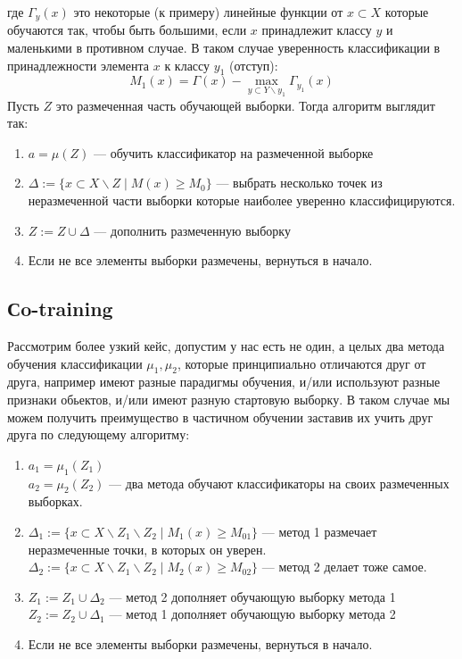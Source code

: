 где $\Gamma_y(x)$ это некоторые (к примеру) линейные функции от $x \subset X$ которые обучаются так, чтобы быть большими, если $x$ принадлежит классу $y$ и маленькими в противном случае. В таком случае уверенность классификации в принадлежности элемента $x$ к классу $y_1$ (отступ):
\begin{equation*}
    M_1(x) = \Gamma(x) - \max_{y \subset Y\backslash y_1}\Gamma_{y_1}(x) 
\end{equation*}
Пусть $Z$ это размеченная часть обучающей выборки. Тогда алгоритм выглядит так:
\begin{enumerate}
  \item $a = \mu(Z)$ --- обучить классификатор на размеченной выборке
  \item $\Delta := \{x \subset X\backslash Z \;|\; M(x) \geq M_0 \}$ --- выбрать несколько точек из неразмеченной части выборки которые наиболее уверенно классифицируются. 
  \item $Z := Z\cup\Delta$ --- дополнить размеченную выборку
  \item Если не все элементы выборки размечены, вернуться в начало.
\end{enumerate}
\subsection{Сo-training}
Рассмотрим более узкий кейс, допустим у нас есть не один, а целых два метода обучения классификации $\mu_1, \mu_2$, которые принципиально отличаются друг от друга, например имеют разные парадигмы обучения, и/или используют разные признаки обьектов, и/или имеют разную стартовую выборку. В таком случае мы можем получить преимущество в частичном обучении заставив их учить друг друга по следующему алгоритму:
\begin{enumerate}
  \item $a_1 = \mu_1(Z_1)$\\
  $a_2 = \mu_2(Z_2)$ --- два метода обучают классификаторы на своих размеченных выборках. 
  \item $\Delta_1 := \{x \subset X\backslash Z_1\backslash Z_2 \;|\; M_1(x) \geq M_{01} \}$ --- метод 1 размечает неразмеченные точки, в которых он уверен.\\
  $\Delta_2 := \{x \subset X\backslash Z_1\backslash Z_2 \;|\; M_2(x) \geq M_{02} \}$ --- метод 2 делает тоже самое.
  \item $Z_1 := Z_1\cup\Delta_2$ --- метод 2 дополняет обучающую выборку метода 1 \\
  $Z_2 := Z_2\cup\Delta_1$ --- метод 1 дополняет обучающую выборку метода 2
  \item Если не все элементы выборки размечены, вернуться в начало.
\end{enumerate}
